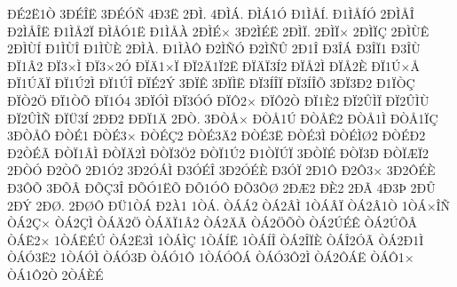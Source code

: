{^^d0^^c92^^cb1^^d2
3^^d0^^c9^^ce^^cb
3^^d0^^c9^^d3^^d1
4^^d03^^cb
2^^d0^^cc.
4^^d0^^cc^^c1.
^^d0^^cc^^c11^^d3
^^d01^^cc^^c5^^cd.
^^d01^^cc^^c5^^cd^^d3
2^^d0^^cc^^c5^^ce
^^d02^^cc^^c5^^ce^^cb
^^d01^^cc^^c52^^cf
^^d0^^cc^^c5^^d31^^cb
^^d01^^cc^^c5^^c0
2^^d0^^cc^^c9^^d7
3^^d02^^cc^^c9^^cb
2^^d0^^cc^^cf.
2^^d0^^cc^^cf^^d7
2^^d0^^cc^^cf^^c7
2^^d0^^cc^^d9^^ca
2^^d0^^cc^^d9^^cd
^^d01^^cc^^d9^^ce
^^d01^^cc^^d9^^c8
2^^d0^^cc^^c0.
^^d01^^cc^^c0^^d4
^^d02^^cc^^d1^^d3
^^d02^^cc^^d1^^db
2^^d01^^ce
^^d03^^ce^^c1
^^d03^^ce^^cf1
^^d03^^ce^^d9
^^d0^^cf1^^c22
^^d0^^cf3^^d7^^cc
^^d0^^cf3^^d72^^d3
^^d0^^cf^^c41^^d7^^cf
^^d0^^cf2^^c41^^cf2^^cb
^^d0^^cf^^c4^^cf3^^cd2
^^d0^^cf^^c52^^cc
^^d0^^cf^^c52^^c8
^^d0^^cf1^^da^^d7^^c5
^^d0^^cf1^^da^^c4^^cf
^^d0^^cf1^^da2^^cc
^^d0^^cf1^^da^^ce
^^d0^^cf^^c92^^dd
3^^d0^^cf^^ca
3^^d0^^cf^^cc^^cb
^^d0^^cf3^^cd^^ce^^cf
^^d0^^cf3^^cd^^ce^^d5
3^^d0^^cf3^^d02
^^d01^^cf^^d2^^c7
^^d0^^cf^^d22^^d6
^^d0^^cf1^^d2^^d5
^^d0^^cf1^^d34
3^^d0^^cf^^d3^^cc
^^d0^^cf3^^d3^^d3
^^d0^^cf^^d42^^d7
^^d0^^cf^^d42^^d2
^^d0^^cf1^^c82
^^d0^^cf2^^db^^cc^^cf
^^d0^^cf2^^db^^cc^^d9
^^d0^^cf2^^db^^cc^^d1
^^d0^^cf^^dc3^^cd
2^^d0^^d02
^^d0^^d0^^cf1^^c4
2^^d0^^d2.
3^^d0^^d2^^c5^^d7
^^d0^^d2^^c51^^da
^^d0^^d2^^c5^^ca2
^^d0^^d2^^c51^^cc
^^d0^^d2^^c51^^cf^^c7
3^^d0^^d2^^c5^^d4
^^d0^^d2^^c91
^^d0^^d2^^c93^^d7
^^d0^^d2^^c9^^c72
^^d0^^d2^^c93^^c42
^^d0^^d2^^c93^^cb
^^d0^^d2^^c93^^cc
^^d0^^d2^^c9^^cc^^d82
^^d0^^d2^^c9^^d02
^^d02^^d2^^c9^^c3
^^d0^^d2^^cf1^^c2^^cc
^^d0^^d2^^cf^^c42^^cc
^^d0^^d2^^cf3^^d62
^^d0^^d2^^cf1^^da2
^^d01^^d2^^cf^^da^^cf
3^^d0^^d2^^cf^^c9
^^d0^^d2^^cf3^^d0
^^d0^^d2^^cf^^c6^^cf2
2^^d0^^d2^^d3
^^d02^^d2^^d5
2^^d01^^d32
3^^d02^^d3^^c1^^cc
^^d03^^d3^^c9^^ce
3^^d02^^d3^^c9^^c8
^^d03^^d3^^cf
2^^d01^^d4
^^d02^^d43^^d7
3^^d02^^d4^^c9^^c8
^^d03^^d4^^d5
3^^d0^^d5^^c2
^^d0^^d5^^c73^^ce
^^d0^^d5^^d31^^cb^^d5
^^d0^^d51^^d3^^d4
^^d0^^d53^^d4^^d8
2^^d0^^c62
^^d0^^c82
2^^d0^^c3
4^^d03^^de
2^^d0^^db
2^^d0^^dd
2^^d0^^d8.
2^^d0^^d8^^d4
^^d0^^dc1^^d2^^c1
^^d02^^c01
1^^d2^^c1.
^^d2^^c1^^c12
^^d2^^c12^^c2^^cc
1^^d2^^c1^^c2^^cf
^^d2^^c12^^c21^^d2
1^^d2^^c1^^d7^^ce^^d1
^^d2^^c12^^c7^^d7
^^d2^^c12^^c7^^cc
^^d2^^c1^^c42^^d6
^^d2^^c1^^c4^^cf1^^c22
^^d2^^c12^^c4^^c3
^^d2^^c12^^d6^^d5^^d2
^^d2^^c12^^da^^c9^^ca
^^d2^^c12^^da^^d5^^c2
^^d2^^c1^^cb2^^d7
1^^d2^^c1^^cb^^c9^^da
^^d2^^c12^^cb3^^cc
1^^d2^^c1^^cc^^c7
1^^d2^^c1^^cd^^cb
1^^d2^^c1^^cd^^ce
^^d2^^c12^^ce^^cf^^c8
^^d2^^c1^^ce2^^d3^^c3
^^d2^^c12^^d01^^cc
^^d2^^c1^^d33^^cb2
1^^d2^^c1^^d3^^cc
^^d2^^c1^^d33^^d0
^^d2^^c1^^d31^^d4
1^^d2^^c1^^d3^^d4^^c1
^^d2^^c1^^d33^^d42^^cc
^^d2^^c12^^d4^^c1^^cb
^^d2^^c1^^d41^^d7
^^d2^^c11^^d42^^d2
2^^d2^^c1^^c8^^c9
}
